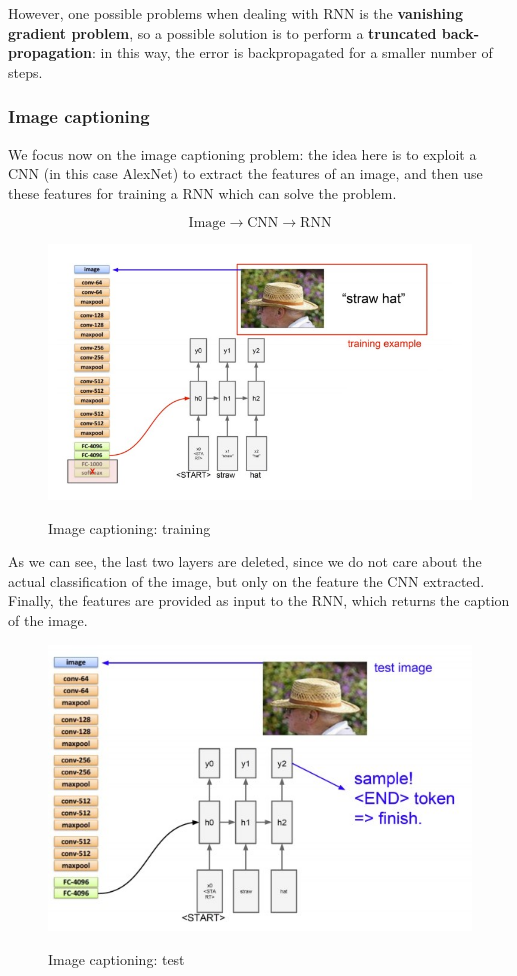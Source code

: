 However, one possible problems when dealing with RNN is the \textbf{vanishing gradient problem}, so a possible solution is to perform a \textbf{truncated back-propagation}: in this way, the error is backpropagated for a smaller number of steps.

\subsubsection{Image captioning}
We focus now on the image captioning problem: the idea here is to exploit a CNN (in this case AlexNet) to extract the features of an image, and then use these features for training a RNN which can solve the problem.

$$
\text{Image} \to \text{CNN} \to \text{RNN}
$$

\begin{figure}[h!]
		\centering
        \includegraphics[scale = 1.5]{img/image captioning 1.jpg}
		\label{mi}
        \caption{Image captioning: training}
\end{figure}

As we can see, the last two layers are deleted, since we do not care about the actual classification of the image, but only on the feature the CNN extracted. Finally, the features are provided as input to the RNN, which returns the caption of the image. 

\begin{figure}[h!]
		\centering
        \includegraphics[scale = 1.5]{img/image captioning 2.jpg}
		\label{mi}
        \caption{Image captioning: test}
\end{figure}

